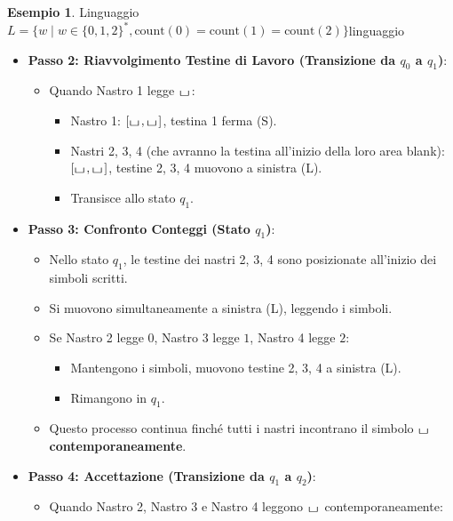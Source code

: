 \documentclass[a4paper]{article}
\theoremstyle{definition} %
\newtheorem{example}{Esempio}
\newcommand{\blankS}{\ensuremath{\raisebox{-0.15ex}{\scalebox{1.3}[0.7]{$\sqcup$}}\mkern2mu}}
\begin{document}
\begin{example}{Linguaggio $L = \{w \mid w \in \{0,1,2\}^*, \text{count}(0)=\text{count}(1)=\text{count}(2)\}$}{linguaggio}
\begin{itemize}
\begin{itemize}
            \item Questo continua finché il Nastro 1 non incontra $\blankS$.
        \end{itemize}
    \item \textbf{Passo 2: Riavvolgimento Testine di Lavoro (Transizione da $q_0$ a $q_1$)}:
        \begin{itemize}
            \item Quando Nastro 1 legge $\blankS$:
                \begin{itemize}
                    \item Nastro 1: $[\blankS, \blankS]$, testina 1 ferma (S).
                    \item Nastri 2, 3, 4 (che avranno la testina all'inizio della loro area blank): $[\blankS, \blankS]$, testine 2, 3, 4 muovono a sinistra (L).
                    \item Transisce allo stato $q_1$.
                \end{itemize}
        \end{itemize}
    \item \textbf{Passo 3: Confronto Conteggi (Stato $q_1$)}:
        \begin{itemize}
            \item Nello stato $q_1$, le testine dei nastri 2, 3, 4 sono posizionate all'inizio dei simboli scritti.
            \item Si muovono simultaneamente a sinistra (L), leggendo i simboli.
            \item Se Nastro 2 legge $0$, Nastro 3 legge $1$, Nastro 4 legge $2$:
                \begin{itemize}
                    \item Mantengono i simboli, muovono testine 2, 3, 4 a sinistra (L).
                    \item Rimangono in $q_1$.
                \end{itemize}
            \item Questo processo continua finché tutti i nastri incontrano il simbolo $\blankS$ \textbf{contemporaneamente}.
        \end{itemize}
    \item \textbf{Passo 4: Accettazione (Transizione da $q_1$ a $q_2$)}:
        \begin{itemize}
            \item Quando Nastro 2, Nastro 3 e Nastro 4 leggono $\blankS$ contemporaneamente:
                \begin{itemize}

\end{itemize}
\end{itemize}
\end{itemize}
\end{example}
\end{document}
